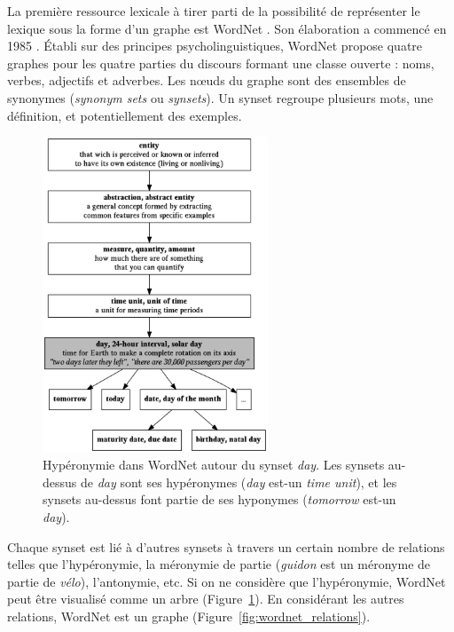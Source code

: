 La première ressource lexicale à tirer parti de la possibilité de représenter
le lexique sous la forme d'un graphe est WordNet \citep{fellbaum1998wordnet}.
Son élaboration a commencé en 1985 \citep{miller1990introduction}. Établi sur
des principes psycholinguistiques, WordNet propose quatre graphes pour les
quatre parties du discours formant une classe ouverte : noms, verbes,
adjectifs et adverbes. Les nœuds du graphe sont des ensembles de synonymes
(\textit{synonym sets} ou \textit{synsets}). Un synset regroupe plusieurs mots, une
définition, et potentiellement des exemples.

\begin{figure}[t]
    \centering
    \includegraphics[width=0.6\textwidth]{fig/wordnet_hypernymy.png}
    \caption{\label{fig:wordnet_hypernymy}Hypéronymie dans WordNet autour du
        synset \textit{day}. Les synsets au-dessus de \textit{day} sont ses hypéronymes
        (\textit{day} est-un \textit{time unit}), et les synsets au-dessus font partie de
        ses hyponymes (\textit{tomorrow} est-un \textit{day}).}
\end{figure}

Chaque synset est lié à d'autres synsets à travers un certain nombre de
relations telles que l'hypéronymie, la méronymie de partie (\textit{guidon} est
un méronyme de partie de \textit{vélo}), l'antonymie, etc. Si on ne considère que
l'hypéronymie, WordNet peut être visualisé comme un arbre
(Figure~\ref{fig:wordnet_hypernymy}). En considérant les autres relations,
WordNet est un graphe (Figure~\ref{fig:wordnet_relations}).

